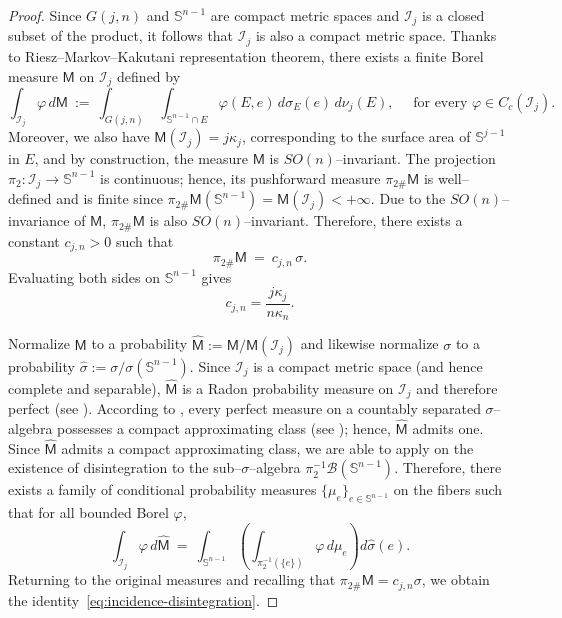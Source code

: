 \documentclass[11pt]{article}
\theoremstyle{definition}
\numberwithin{equation}{section}
\newcommand{\Sph}{\mathbb{S}}        %
\begin{document}
\begin{proof}
Since $G(j,n)$ and $\Sph^{n-1}$ are compact metric spaces and $\mathcal I_j$ is a closed subset of the product, it follows that $\mathcal I_j$ is also a compact metric space. 
Thanks to Riesz–Markov–Kakutani representation theorem, there exists a finite Borel measure $\mathsf M$ on $\mathcal I_j$ defined by
\begin{equation}\label{eq:Ij-measure}
  \int_{\mathcal I_j}\!\varphi\,d\mathsf M
  \ :=\ \int_{G(j,n)}\ \int_{\Sph^{n-1}\cap E} \varphi(E,e)\,d\sigma_E(e)\,d\nu_j(E),
  \quad \text{ for every } \varphi\in C_c(\mathcal I_j).
\end{equation}
Moreover, we also have $\mathsf M(\mathcal I_j) = j \kappa_j$, corresponding to the surface area of $\mathbb S^{j - 1}$ in $E$, and by construction, the measure $\mathsf M$ is $SO(n)$--invariant. 
The projection $\pi_2 : \mathcal I_j\to \Sph^{n-1}$ is continuous; hence, its pushforward measure $\pi_{2\#}\mathsf M$ is well--defined and is finite since $\pi_{2\#} \mathsf M(\mathbb S^{n - 1}) = \mathsf M(\mathcal I_j) < + \infty$.
Due to the $SO(n)$–invariance of $\mathsf M$, $\pi_{2\#}\mathsf M$ is also $SO(n)$--invariant.
Therefore, there exists a constant $c_{j, n} > 0$ such that
\[
  \pi_{2\#}\mathsf M \ =\ c_{j,n}\,\sigma.
\]
Evaluating both sides on $\mathbb S^{n - 1}$ gives
\[
    c_{j, n} = \dfrac{j \kappa_j}{n \kappa_n}.
\]

\medskip

Normalize $\mathsf M$ to a probability $\widehat{\mathsf M}:=\mathsf M/\mathsf M(\mathcal I_j)$ and likewise normalize $\sigma$ to a probability $\widehat\sigma:=\sigma/\sigma(\Sph^{n-1})$. 
Since $\mathcal I_j$ is a compact metric space (and hence complete and separable), $\widehat{\mathsf M}$ is a Radon probability measure on $\mathcal I_j$ and therefore perfect (see \cite[Theorems 7.1.7 and 7.5.10]{Bogachev_2007}).
According to \cite[Theorem 7.5.6--(iv)]{Bogachev_2007}, every perfect measure on a countably separated $\sigma$–algebra possesses a compact approximating class (see \cite[Definition 1.4.6]{Bogachev_2007}); hence, $\widehat{\mathsf M}$ admits one. 
Since $\widehat{\mathsf M}$ admits a compact approximating class, we are able to apply \cite[Corollary 10.6.7]{Bogachev_2007} on the existence of disintegration to the sub--$\sigma$--algebra $\pi_2^{-1}\mathcal B(\Sph^{n-1})$.
Therefore, there exists a family of conditional probability measures $\{\mu_e\}_{e\in \Sph^{n-1}}$ on the fibers such that for all bounded Borel $\varphi$,
\[
  \int_{\mathcal I_j}\! \varphi\,d\widehat{\mathsf M}
  \ =\ \int_{\Sph^{n-1}} \left(\int_{\pi_2^{-1}(\{e\})}\! \varphi\,d\mu_e\right) d\widehat\sigma(e).
\]
Returning to the original measures and recalling that $\pi_{2\#}\mathsf M=c_{j,n}\sigma$, we obtain the identity~\eqref{eq:incidence-disintegration}. 


\end{proof}
\end{document}
